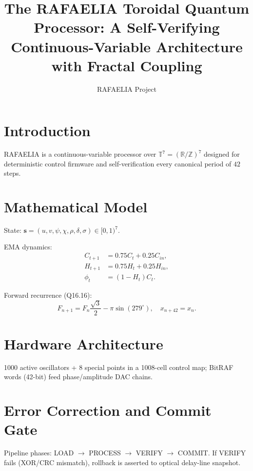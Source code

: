 \documentclass[11pt]{article}
\title{The RAFAELIA Toroidal Quantum Processor: A Self-Verifying Continuous-Variable Architecture with Fractal Coupling}
\author{RAFAELIA Project}
\date{}
\begin{document}
\maketitle

\section{Introduction}
RAFAELIA is a continuous-variable processor over $\mathbb{T}^7=(\mathbb{R}/\mathbb{Z})^7$ designed for deterministic control firmware and self-verification every canonical period of $42$ steps.

\section{Mathematical Model}
State: $\mathbf{s}=(u,v,\psi,\chi,\rho,\delta,\sigma) \in [0,1)^7$.

EMA dynamics:
\begin{align}
C_{t+1}&=0.75C_t+0.25C_{in},\\
H_{t+1}&=0.75H_t+0.25H_{in},\\
\phi_t&=(1-H_t)C_t.
\end{align}

Forward recurrence (Q16.16):
\begin{equation}
F_{n+1}=F_n\frac{\sqrt{3}}{2}-\pi\sin(279^\circ),\quad x_{n+42}=x_n.
\end{equation}

\section{Hardware Architecture}
1000 active oscillators + 8 special points in a 1008-cell control map; BitRAF words (42-bit) feed phase/amplitude DAC chains.

\begin{center}
\end{center}

\section{Error Correction and Commit Gate}
Pipeline phases: LOAD $\rightarrow$ PROCESS $\rightarrow$ VERIFY $\rightarrow$ COMMIT. If VERIFY fails (XOR/CRC mismatch), rollback is asserted to optical delay-line snapshot.
\end{document}
